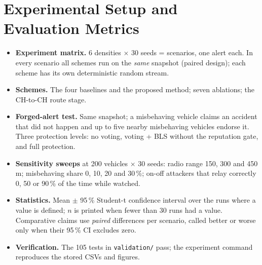 \documentclass[11pt, a4paper]{article}
\begin{document}
\section{Experimental Setup and Evaluation Metrics}
\label{sec:setup}
\begin{itemize}[noitemsep, topsep=2pt]
  \item \textbf{Experiment matrix.} 6 densities $\times$ 30 seeds = \NScenarios{} scenarios, one alert each. In every
        scenario all schemes run on the \emph{same} snapshot (paired design); each scheme has its own deterministic random
        stream.
  \item \textbf{Schemes.} The four baselines and the proposed method; seven ablations; the CH-to-CH route stage.
  \item \textbf{Forged-alert test.} Same snapshot; a misbehaving vehicle claims an accident that did not happen and up to
        five nearby misbehaving vehicles endorse it. Three protection levels: no voting, voting + BLS without the
        reputation gate, and full protection.
  \item \textbf{Sensitivity sweeps} at 200 vehicles $\times$ 30 seeds: radio range 150, 300 and 450 m; misbehaving
        share 0, 10, 20 and 30\,\%; on-off attackers that relay correctly 0, 50 or 90\,\% of the time while watched.
  \item \textbf{Statistics.} Mean $\pm$ 95\,\% Student-t confidence interval over the runs where a value is defined; $n$ is
        printed when fewer than 30 runs had a value. Comparative claims use \emph{paired} differences per scenario,
        called better or worse only when their 95\,\% CI excludes zero.
  \item \textbf{Verification.} The 105 tests in \texttt{validation/} pass; the experiment command reproduces the stored
        CSVs and figures.
\end{itemize}
\end{document}
